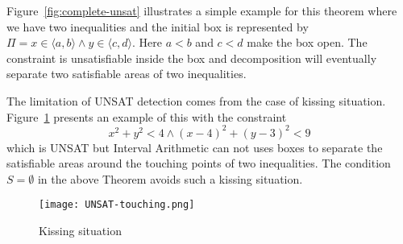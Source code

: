 Figure~\ref{fig:complete-unsat} illustrates a simple example for this theorem where we have two inequalities and the initial box is represented by $\Pi = x \in \langle a, b \rangle \wedge y \in \langle c, d \rangle$. Here $a < b$ and $c < d$ make the box open. The constraint is unsatisfiable inside the box and decomposition will eventually separate two satisfiable areas of two inequalities.

The limitation of UNSAT detection comes from the case of kissing situation. Figure~\ref{fig:kissing} presents an example of this with the constraint \[x^2 + y^2 < 4 \wedge (x-4)^2 + (y-3)^2 < 9\]
which is UNSAT but Interval Arithmetic can not uses boxes to separate the satisfiable areas around the touching points of two inequalities. The condition $S = \emptyset$ in the above Theorem avoids such a kissing situation.  

\begin{figure}[ht]
\centering
\texttt{[image: UNSAT-touching.png]} 
\caption{Kissing situation}
\label{fig:kissing}
\end{figure}

